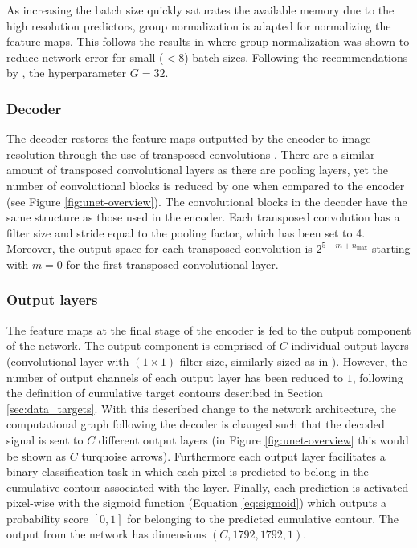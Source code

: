 \documentclass[../main/thesis]{subfiles}
\begin{document}
As increasing the batch size quickly saturates the available memory due to the high resolution predictors, group normalization is adapted for normalizing the feature maps. This follows the results in \citet{Wu2018} where group normalization was shown to reduce network error for small ($<8$) batch sizes. Following the recommendations by \citet{Wu2018}, the hyperparameter $G=32$. 

\subsubsection{Decoder}
The decoder restores the feature maps outputted by the encoder to image-resolution through the use of transposed convolutions \citep{Zeiler2010}. There are a similar amount of transposed convolutional layers as there are pooling layers, yet the number of convolutional blocks is reduced by one when compared to the encoder (see Figure \ref{fig:unet-overview}). The convolutional blocks in the decoder have the same structure as those used in the encoder. Each transposed convolution has a filter size and stride equal to the pooling factor, which has been set to 4. Moreover, the output space for each transposed convolution is $2^{5 - m + n_{\text{max}}}$ starting with $m = 0$ for the first transposed convolutional layer.

\subsubsection{Output layers}
\label{sec:architecture-output}
The feature maps at the final stage of the encoder is fed to the output component of the network. The output component is comprised of $C$ individual output layers (convolutional layer with $(1 \times 1)$ filter size, similarly sized as in \citet{Ronneberger2015}). However, the number of output channels of each output layer has been reduced to $1$, following the definition of cumulative target contours described in Section \ref{sec:data_targets}. With this described change to the network architecture, the computational graph following the decoder is changed such that the decoded signal is sent to $C$ different output layers (in Figure \ref{fig:unet-overview} this would be shown as $C$ turquoise arrows). Furthermore each output layer facilitates a binary classification task in which each pixel is predicted to belong in the cumulative contour associated with the layer. Finally, each prediction is activated pixel-wise with the sigmoid function (Equation \ref{eq:sigmoid}) which outputs a probability score $\left[0, 1\right]$ for belonging to the predicted cumulative contour. The output from the network has dimensions $(C, 1792, 1792, 1)$.
\end{document}
